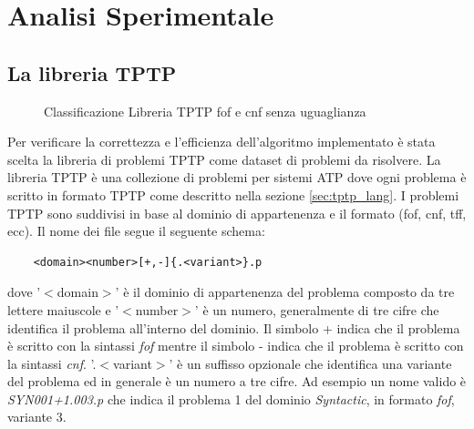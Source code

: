 \documentclass[./main.tex]{subfiles}
\begin{document}
\chapter{Analisi Sperimentale}
\section{La libreria TPTP}
\begin{figure}[h]
    \centering
    \caption{Classificazione Libreria TPTP fof e cnf senza uguaglianza}
    \label{fig:classificazione_tptp}
\end{figure}

Per verificare la correttezza e l'efficienza dell'algoritmo implementato è stata scelta 
la libreria di problemi TPTP \cite{tptpLib} come dataset di problemi da risolvere. 
La libreria TPTP è una collezione di problemi per sistemi ATP dove ogni problema è scritto in formato
TPTP come descritto nella sezione \ref{sec:tptp_lang}.
I problemi TPTP sono suddivisi in base al dominio di appartenenza e il formato (fof, cnf, tff, ecc).
Il nome dei file segue il seguente schema:
\begin{verbatim}
    <domain><number>[+,-]{.<variant>}.p
\end{verbatim}

dove '$<$domain$>$' è il dominio di appartenenza del problema composto da tre lettere maiuscole e
'$<$number$>$' è un numero, generalmente di tre cifre che identifica il problema all'interno del dominio.
Il simbolo + indica che il problema è scritto con la sintassi \textit{fof} mentre il simbolo - indica
che il problema è scritto con la sintassi \textit{cnf}. '.$<$variant$>$' è un suffisso opzionale che
identifica una variante del problema ed in generale è un numero a tre cifre.
Ad esempio un nome valido è \textit{SYN001+1.003.p} che indica il problema 1 del dominio \textit{Syntactic},
in formato \textit{fof}, variante 3. 
\end{document}
